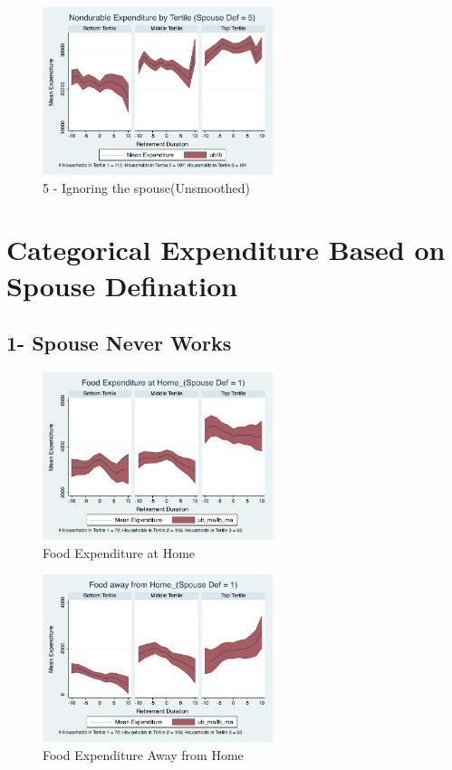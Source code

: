 \documentclass[11pt,onecolumn]{article}
\begin{document}
\begin{figure}[h]
	\caption{5 - Ignoring the spouse(Unsmoothed)}
	\centering
	\includegraphics[width=0.6\textwidth]{../ConsumptionPostRetirement_by_SpouseDef/UnSmoothed/spouse_def_5.pdf}
\end{figure}

\clearpage

\section{Categorical Expenditure Based on Spouse Defination}

\subsection{1- Spouse Never Works}

\begin{figure}[h]
	\caption{Food Expenditure at Home}
	\centering
	\includegraphics[width=0.6\textwidth]{../ConsumptionPostRetirement_by_SpouseDef_Cats/Smoothed/1/spouse_def_total_foodexp_home_real.pdf}
\end{figure}


\begin{figure}[h]
	\caption{Food Expenditure Away from Home}
	\centering
	\includegraphics[width=0.6\textwidth]{../ConsumptionPostRetirement_by_SpouseDef_Cats/Smoothed/1/spouse_def_total_foodexp_away_real.pdf}
\end{figure}
\end{document}
